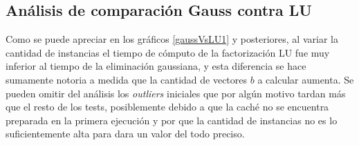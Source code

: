 \subsection{Análisis de comparación Gauss contra LU}
Como se puede apreciar en los gráficos \ref{gaussVsLU1} y posteriores, al variar la cantidad de instancias el tiempo de cómputo de la factorización LU fue muy inferior al tiempo de la eliminación gaussiana, y esta diferencia se hace sumamente notoria a medida que la cantidad de vectores $b$ a calcular aumenta. Se pueden omitir del análisis los \emph{outliers} iniciales que por algún motivo tardan más que el resto de los tests, posiblemente debido a que la caché no se encuentra preparada en la primera ejecución y por que la cantidad de instancias no es lo suficientemente alta para dara un valor del todo preciso.
